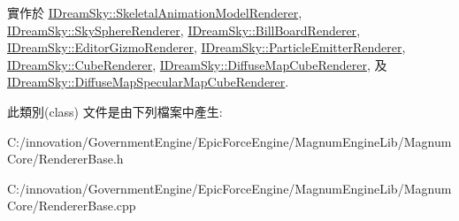 實作於 \hyperlink{class_i_dream_sky_1_1_skeletal_animation_model_renderer_a8427de8eabbb08c41f31d61497da604b}{I\+Dream\+Sky\+::\+Skeletal\+Animation\+Model\+Renderer}, \hyperlink{class_i_dream_sky_1_1_sky_sphere_renderer_a7f002e11ce48fad92fae9e3815ef77d9}{I\+Dream\+Sky\+::\+Sky\+Sphere\+Renderer}, \hyperlink{class_i_dream_sky_1_1_bill_board_renderer_a5ce38348110a2f7861f4ec2427518100}{I\+Dream\+Sky\+::\+Bill\+Board\+Renderer}, \hyperlink{class_i_dream_sky_1_1_editor_gizmo_renderer_ab6927ae29535aaf089d11b3e2b7f164f}{I\+Dream\+Sky\+::\+Editor\+Gizmo\+Renderer}, \hyperlink{class_i_dream_sky_1_1_particle_emitter_renderer_a71deeeed3c70b5f468c57ae370858721}{I\+Dream\+Sky\+::\+Particle\+Emitter\+Renderer}, \hyperlink{class_i_dream_sky_1_1_cube_renderer_a6635459b90a33f12eec2d58f4d930984}{I\+Dream\+Sky\+::\+Cube\+Renderer}, \hyperlink{class_i_dream_sky_1_1_diffuse_map_cube_renderer_ada517b09adf24db2a094f17021dfe2a2}{I\+Dream\+Sky\+::\+Diffuse\+Map\+Cube\+Renderer}, 及 \hyperlink{class_i_dream_sky_1_1_diffuse_map_specular_map_cube_renderer_acd78d0b836cf88110dc2b2260d96a7d9}{I\+Dream\+Sky\+::\+Diffuse\+Map\+Specular\+Map\+Cube\+Renderer}.



此類別(class) 文件是由下列檔案中產生\+:\begin{DoxyCompactItemize}
\item 
C\+:/innovation/\+Government\+Engine/\+Epic\+Force\+Engine/\+Magnum\+Engine\+Lib/\+Magnum\+Core/Renderer\+Base.\+h\item 
C\+:/innovation/\+Government\+Engine/\+Epic\+Force\+Engine/\+Magnum\+Engine\+Lib/\+Magnum\+Core/Renderer\+Base.\+cpp\end{DoxyCompactItemize}
